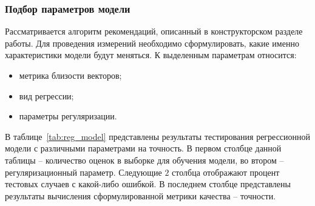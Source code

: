 \subsubsection{Подбор параметров модели}
Рассматривается алгоритм рекомендаций, описанный в конструкторском разделе работы.
Для проведения измерений необходимо сформулировать, какие именно характеристики модели будут меняться.
К выделенным параметрам относится:
\begin{itemize}
	\item метрика близости векторов;
	\item вид регрессии;
	\item параметры регуляризации.
\end{itemize}
В таблице~\ref{tab:reg_model} представлены результаты тестирования регрессионной модели с различными параметрами на точность.
В первом столбце данной таблицы -- количество оценок в выборке для обучения модели, во втором -- регуляризационный параметр.
Следующие $2$ столбца отображают процент тестовых случаев с какой-либо ошибкой.
В последнем столбце представлены результаты вычисления сформулированной метрики качества -- точности.

